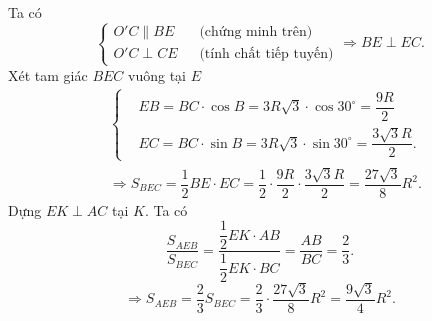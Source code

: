 \begin{ex}
{$$\begin{array}{rl}
\end{array}$$
Ta có $$\left\{ \begin{array}{ll}
O'C \parallel BE\quad& \text{(chứng minh trên)}\\
O'C \perp CE &\text{(tính chất tiếp tuyến)}
\end{array}\right. \Rightarrow BE \perp EC.$$
Xét tam giác $BEC$ vuông tại $E$
\begin{align*}
&\begin{cases}
&EB=BC\cdot \cos B =3R\sqrt{3}\cdot \cos 30^\circ=\dfrac{9R}{2}\\
&EC=BC\cdot \sin B=3R\sqrt{3} \cdot \sin 30^\circ=\dfrac{3\sqrt{3}R}{2}.
\end{cases}\\
&\Rightarrow S_{BEC}=\dfrac{1}{2}BE\cdot EC=\dfrac{1}{2}\cdot \dfrac{9R}{2} \cdot \dfrac{3\sqrt{3}R}{2}=\dfrac{27\sqrt{3}}{8}R^2.
\end{align*}
Dựng $EK \perp AC $ tại $K$. Ta có
$$\dfrac{S_{AEB}}{S_{BEC}}=\dfrac{\dfrac{1}{2}EK\cdot AB}{\dfrac{1}{2}EK\cdot BC}=\dfrac{AB}{BC}=\dfrac{2}{3}.$$
$$\Rightarrow S_{AEB}=\dfrac{2}{3}S_{BEC}=\dfrac{2}{3}\cdot \dfrac{27\sqrt{3}}{8}R^2=\dfrac{9\sqrt{3}}{4}R^2.$$
	}
	\end{ex}
